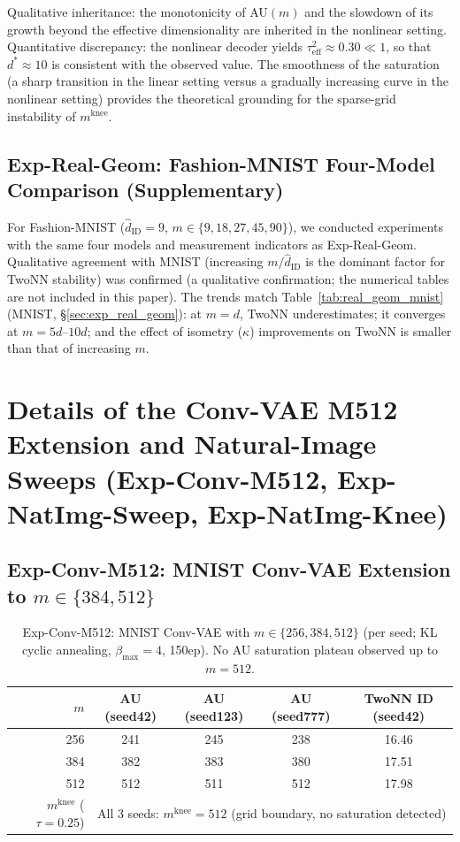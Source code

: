 \documentclass[make,article,submit,pdftex,moreauthors]{Definitions/mdpi}
\newcommand{\kap}{\kappa}
\newcommand{\mknee}{m^{\mathrm{knee}}}
\begin{document}
Qualitative inheritance: the monotonicity of AU$(m)$ and the slowdown of its growth beyond the effective dimensionality are inherited in the nonlinear setting.
Quantitative discrepancy: the nonlinear decoder yields $\tau^2_\mathrm{eff} \approx 0.30 \ll 1$, so that $d^* \approx 10$ is consistent with the observed value.
The smoothness of the saturation (a sharp transition in the linear setting versus a gradually increasing curve in the nonlinear setting) provides the theoretical grounding for the sparse-grid instability of $\mknee$.

\subsection*{Exp-Real-Geom: Fashion-MNIST Four-Model Comparison (Supplementary)}

For Fashion-MNIST ($\hat{d}_\mathrm{ID}=9$, $m \in \{9,18,27,45,90\}$),
we conducted experiments with the same four models and measurement indicators as Exp-Real-Geom.
Qualitative agreement with MNIST (increasing $m/\hat{d}_\mathrm{ID}$ is the dominant factor for TwoNN stability)
was confirmed (a qualitative confirmation; the numerical tables are not included in this paper).
The trends match Table~\ref{tab:real_geom_mnist} (MNIST, \S\ref{sec:exp_real_geom}):
at $m = d$, TwoNN underestimates; it converges at $m = 5d$--$10d$;
and the effect of isometry ($\kap$) improvements on TwoNN is smaller than that of increasing $m$.

\section[\appendixname~\thesection]{Details of the Conv-VAE M512 Extension and Natural-Image Sweeps (Exp-Conv-M512, Exp-NatImg-Sweep, Exp-NatImg-Knee)}\label{app:convvae_natimg}

\subsection*{Exp-Conv-M512: MNIST Conv-VAE Extension to $m \in \{384, 512\}$}

\begin{table}[H]
\centering
\caption{Exp-Conv-M512: MNIST Conv-VAE with $m \in \{256, 384, 512\}$ (per seed; KL cyclic annealing, $\beta_\mathrm{max}=4$, 150ep). No AU saturation plateau observed up to $m=512$.}
\label{tab:en_ext}
\small
\begin{tabular}{r ccc c}
\toprule
$m$ & AU (seed42) & AU (seed123) & AU (seed777) & TwoNN ID (seed42) \\
\midrule
256 & 241 & 245 & 238 & 16.46 \\
384 & 382 & 383 & 380 & 17.51 \\
512 & 512 & 511 & 512 & 17.98 \\
\midrule
$\mknee$ ($\tau=0.25$) & \multicolumn{4}{c}{All 3 seeds: $\mknee=512$ (grid boundary, no saturation detected)} \\
\bottomrule
\end{tabular}
\end{table}
\end{document}
